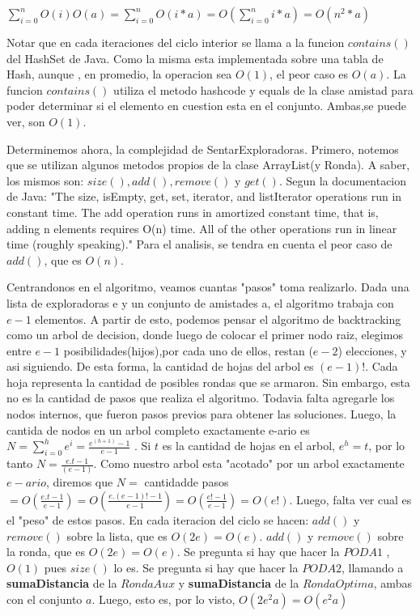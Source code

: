 \documentclass[10pt, a4paper]{article}
\begin{document}
\hspace{30mm}$\sum\limits_{i=0}^n O(i)O(a) =  \sum\limits_{i=0}^n O(i*a) = O(\sum\limits_{i=0}^n i*a) = O(n^2*a)$ 

Notar que en cada iteraciones del ciclo interior se llama a la funcion $contains()$ del HashSet de Java. Como la misma esta implementada sobre una tabla de Hash, aunque , en promedio, la operacion sea $O(1)$, el peor caso es $O(a)$. La funcion $contains()$ utiliza el metodo hashcode y equals de la clase amistad para poder determinar si el elemento en cuestion esta en el conjunto. Ambas,se puede ver, son $O(1)$.


Determinemos ahora, la complejidad de SentarExploradoras.
Primero, notemos que se utilizan algunos metodos propios de la clase ArrayList(y Ronda). A saber, los mismos son: $size(),add(),remove()$ y $get()$. Segun la documentacion de Java:
"The size, isEmpty, get, set, iterator, and listIterator operations run in constant time. The add operation runs in amortized constant time, that is, adding n elements requires O(n) time. All of the other operations run in linear time (roughly speaking)." Para el analisis, se tendra en cuenta el peor caso de $add()$, que es $O(n)$.

Centrandonos en el algoritmo, veamos cuantas "pasos" toma realizarlo.  Dada una lista de exploradoras e y un conjunto de amistades a, el algoritmo trabaja con $e-1$ elementos. A partir de esto, podemos pensar el algoritmo de backtracking como un arbol de decision, donde luego de colocar el primer nodo raiz, elegimos entre $e-1$ posibilidades(hijos),por cada uno de ellos, restan ($e-2$) elecciones, y asi siguiendo. De esta forma, la cantidad de hojas del arbol es $(e-1)!$. Cada hoja representa la cantidad de posibles rondas que se armaron. Sin embargo, esta no es la cantidad de pasos que realiza el algoritmo. Todavia falta agregarle los nodos internos, que fueron pasos previos para obtener las soluciones. Luego, la cantida de nodos en un arbol completo  exactamente e-ario es $N = \sum\limits_{i=0}^h e ^i = \frac{e^{(h+1)} -1}{e-1} $ . Si $t$ es la cantidad de hojas en el arbol, $e^{h} = t$, por lo tanto $N = \frac{e.t -1}{(e-1)}$. Como nuestro arbol esta "acotado" por un arbol exactamente  $e-ario$, diremos que
$N = $ cantidadde pasos $= O(\frac{e.t -1}{e-1}) = O(\frac{e.(e-1)! -1}{e-1}) = O(\frac{e! -1}{e-1}) = O(e!)$. Luego, falta ver cual es el "peso" de estos pasos. 
En cada iteracion del ciclo se hacen:
$add()$ y $remove()$ sobre la lista, que es $O(2e) = O(e).$
$add()$ y $remove()$ sobre la ronda, que es $O(2e) = O(e).$
Se pregunta si hay que hacer la $PODA1$ , $O(1)$ pues $size()$ lo es.
Se pregunta si hay que hacer la $PODA2$, llamando a \textbf{sumaDistancia} de la $RondaAux$ y \textbf{sumaDistancia} de la $RondaOptima$, ambas con el conjunto $a$. Luego, esto es, por lo visto, $O(2e^{2}a) = O(e^{2}a)$
\end{document}
